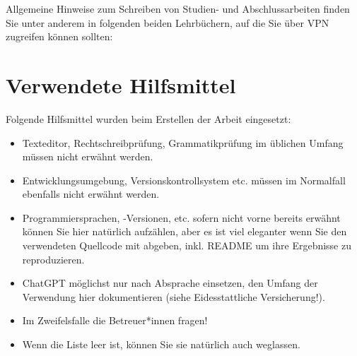 \documentclass[german]{abarbeit}
\begin{document}
Allgemeine Hinweise zum Schreiben von Studien- und Abschlussarbeiten finden Sie unter anderem in folgenden beiden Lehrbüchern,
auf die Sie über VPN zugreifen können sollten:

\begin{quote}%

\end{quote}









\backmatter
\printbibliography

\iffalse
\listoffigures
\fi
\iffalse
\ifcsname listofalgorithms\endcsname
\listofalgorithms
\fi\fi

\appendix
%

\chapter*{Verwendete Hilfsmittel}

Folgende Hilfsmittel wurden beim Erstellen der Arbeit eingesetzt:

\begin{itemize}
\item Texteditor, Rechtschreibprüfung, Grammatikprüfung im üblichen Umfang müssen nicht erwähnt werden.
\item Entwicklungsumgebung, Versionskontrollsystem etc.{} müssen im Normalfall ebenfalls nicht erwähnt werden.
\item Programmiersprachen, -Versionen, etc.{} sofern nicht vorne bereits erwähnt können Sie hier natürlich aufzählen, aber es ist viel eleganter wenn Sie den verwendeten Quellcode mit abgeben, inkl.{} README um ihre Ergebnisse zu reproduzieren.
\item ChatGPT möglichst nur nach Absprache einsetzen, den Umfang der Verwendung hier dokumentieren (siehe Eidesstattliche Versicherung!).
\item Im Zweifelsfalle die Betreuer*innen fragen!
\item Wenn die Liste leer ist, können Sie sie natürlich auch weglassen.
\end{itemize}
\end{document}
